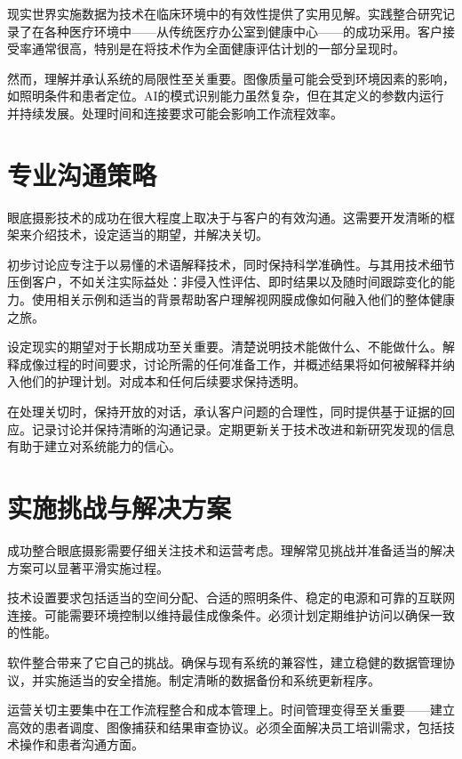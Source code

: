 \documentclass[
  Letterpaper,
]{scrbook}
\begin{document}
现实世界实施数据为技术在临床环境中的有效性提供了实用见解。实践整合研究记录了在各种医疗环境中------从传统医疗办公室到健康中心------的成功采用。客户接受率通常很高，特别是在将技术作为全面健康评估计划的一部分呈现时。

然而，理解并承认系统的局限性至关重要。图像质量可能会受到环境因素的影响，如照明条件和患者定位。AI的模式识别能力虽然复杂，但在其定义的参数内运行并持续发展。处理时间和连接要求可能会影响工作流程效率。

\section{专业沟通策略}\label{ux4e13ux4e1aux6c9fux901aux7b56ux7565}

眼底摄影技术的成功在很大程度上取决于与客户的有效沟通。这需要开发清晰的框架来介绍技术，设定适当的期望，并解决关切。

初步讨论应专注于以易懂的术语解释技术，同时保持科学准确性。与其用技术细节压倒客户，不如关注实际益处：非侵入性评估、即时结果以及随时间跟踪变化的能力。使用相关示例和适当的背景帮助客户理解视网膜成像如何融入他们的整体健康之旅。

设定现实的期望对于长期成功至关重要。清楚说明技术能做什么、不能做什么。解释成像过程的时间要求，讨论所需的任何准备工作，并概述结果将如何被解释并纳入他们的护理计划。对成本和任何后续要求保持透明。

在处理关切时，保持开放的对话，承认客户问题的合理性，同时提供基于证据的回应。记录讨论并保持清晰的沟通记录。定期更新关于技术改进和新研究发现的信息有助于建立对系统能力的信心。

\section{实施挑战与解决方案}\label{ux5b9eux65bdux6311ux6218ux4e0eux89e3ux51b3ux65b9ux6848}

成功整合眼底摄影需要仔细关注技术和运营考虑。理解常见挑战并准备适当的解决方案可以显著平滑实施过程。

技术设置要求包括适当的空间分配、合适的照明条件、稳定的电源和可靠的互联网连接。可能需要环境控制以维持最佳成像条件。必须计划定期维护访问以确保一致的性能。

软件整合带来了它自己的挑战。确保与现有系统的兼容性，建立稳健的数据管理协议，并实施适当的安全措施。制定清晰的数据备份和系统更新程序。

运营关切主要集中在工作流程整合和成本管理上。时间管理变得至关重要------建立高效的患者调度、图像捕获和结果审查协议。必须全面解决员工培训需求，包括技术操作和患者沟通方面。
\end{document}
